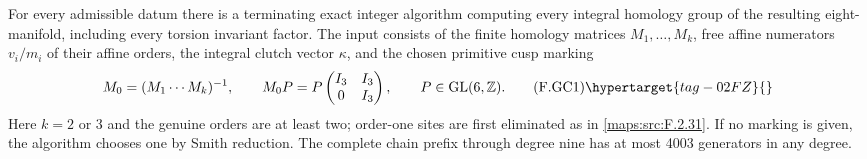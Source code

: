 \begin{theorem}\hypertarget{tag-02NQ}{}\label{maps:src:F.2.35}


For every admissible datum there is a terminating exact
integer algorithm computing every integral homology group of
the resulting eight-manifold, including every torsion invariant
factor.  The input consists of the finite homology matrices
$M_1,\ldots,M_k$, free affine numerators $v_i/m_i$ of their
affine orders, the integral clutch vector $\kappa$, and the
chosen primitive cusp marking
\[
 M_0=(M_1\cdots M_k)^{-1},\qquad
 M_0P=P\begin{pmatrix}I_3&I_3\\0&I_3\end{pmatrix},
 \qquad P\in\mathrm{GL}(6,\mathbb Z).                       \tag{F.GC1}\hypertarget{tag-02FZ}{}\label{maps:eq:F.GC1}
\]
Here $k=2$ or $3$ and the genuine orders are at least two;
order-one sites are first eliminated as in \ref{maps:src:F.2.31}.
If no marking is given, the algorithm chooses one by Smith reduction.
The complete chain prefix through degree nine has at most
4003 generators in any degree.  

\end{theorem}
